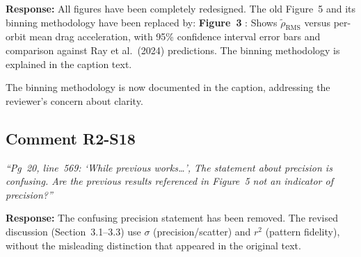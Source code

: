 \documentclass[11pt]{article}
\newcommand{\reviewercomment}[1]{%
  \medskip
  \noindent\textit{\color{reviewblue}#1}%
  \medskip
}
\begin{document}
\textbf{Response:}
All figures have been completely redesigned. The old Figure~5 and its binning methodology have been replaced by:
\textbf{Figure~3} : Shows $\tilde{\rho}_\mathrm{RMS}$ versus per-orbit mean drag acceleration, with 95\% confidence interval error bars and comparison against Ray et al.\ (2024) predictions. The binning methodology is explained in the caption text.

The binning methodology is now documented in the caption, addressing the reviewer's concern about clarity.

\subsection{Comment R2-S18}

\reviewercomment{%
``Pg~20, line~569: `While previous works\ldots', The statement about precision is confusing. Are the previous results referenced in Figure~5 not an indicator of precision?''}

\textbf{Response:}
The confusing precision statement has been removed. The revised discussion (Section~3.1--3.3) use $\sigma$ (precision/scatter) and $r^2$ (pattern fidelity), without the misleading distinction that appeared in the original text.
\end{document}

